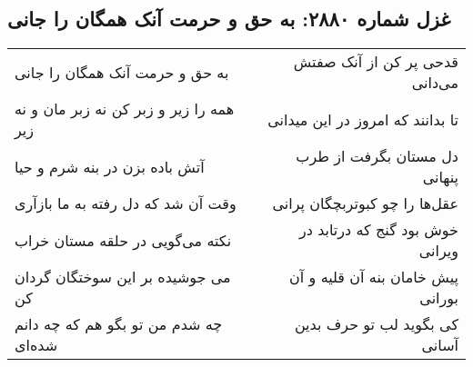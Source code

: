\begin{center}
\section*{غزل شماره ۲۸۸۰: به حق و حرمت آنک همگان را جانی}
\label{sec:2880}
\begin{longtable}{l p{0.5cm} r}
به حق و حرمت آنک همگان را جانی
&&
قدحی پر کن از آنک صفتش می‌دانی
\\
همه را زیر و زبر کن نه زبر مان و نه زیر
&&
تا بدانند که امروز در این میدانی
\\
آتش باده بزن در بنه شرم و حیا
&&
دل مستان بگرفت از طرب پنهانی
\\
وقت آن شد که دل رفته به ما بازآری
&&
عقل‌ها را چو کبوتربچگان پرانی
\\
نکته می‌گویی در حلقه مستان خراب
&&
خوش بود گنج که درتابد در ویرانی
\\
می جوشیده بر این سوختگان گردان کن
&&
پیش خامان بنه آن قلیه و آن بورانی
\\
چه شدم من تو بگو هم که چه دانم شده‌ای
&&
کی بگوید لب تو حرف بدین آسانی
\\
\end{longtable}
\end{center}
